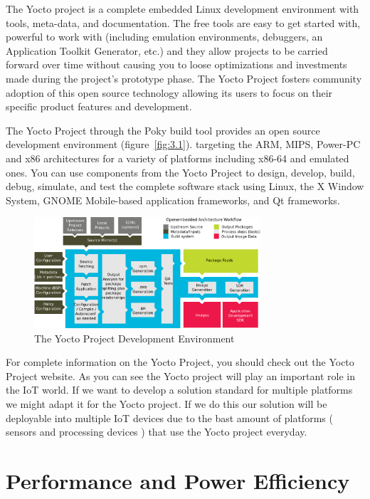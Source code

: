 The Yocto project  is a  complete embedded Linux development environment with
tools, meta-data, and documentation. The free tools are easy to get started
with, powerful to work with (including emulation environments, debuggers, an
Application Toolkit Generator, etc.) and they allow projects to be carried
forward over time without causing you to loose optimizations and investments
made during the project's prototype phase. The Yocto Project fosters community
adoption of this open source technology allowing its users to focus on their
specific product features and development.

The Yocto Project through the Poky build tool provides an open source
development environment (figure~\ref{fig:3.1}). targeting the ARM, MIPS,
Power-PC and x86 architectures for a variety of platforms including x86-64 and
emulated ones.  You can use components from the Yocto Project to design,
develop, build, debug, simulate, and test the complete software stack using
Linux, the X Window System, GNOME Mobile-based application frameworks, and Qt
frameworks. 

\begin{figure}[H]
\centering
\includegraphics[width=0.75\textwidth]{images/yocto-environment.png}
\caption{The Yocto Project Development Environment}
\label{fig:3.2}
\end{figure}

For complete information on the Yocto Project, you should check out the Yocto
Project website\cite{yocto-project}. As you can see the Yocto project will play
an important role in the IoT world. If we want to develop a solution standard
for multiple platforms we might adapt it for the Yocto project. If we do this
our solution will be deployable into multiple IoT devices due to the bast
amount of platforms ( sensors and processing devices ) that use the Yocto
project everyday.

\section{Performance and Power Efficiency}

